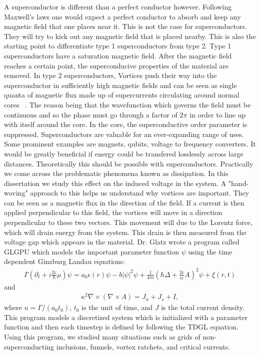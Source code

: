  A superconductor is different than a perfect conductor however. Following Maxwell's laws one would expect a perfect conductor to absorb and keep any magnetic field that one places near it. This is not the case for superconductors. They will try to kick out any magnetic field that is placed nearby. This is also the starting point to differentiate type 1 superconductors from type 2. Type 1 superconductors have a saturation magnetic field. After the magnetic field reaches a certain point, the superconducive properties of the material are removed. In type 2 superconductors, Vortices push their way into the superconductor in sufficiently high magnetic fields and can be seen as single quanta of magnetic flux made up of supercurrents circulating around normal cores ~\cite{Kwok16}. The reason being that the wavefunction which governs the field must be continuous and so the phase must go through a factor of $2\pi$ in order to line up with itself around the core. In the core, the superconductive order parameter is suppressed.  
Superconductors are valuable for an ever-expanding range of uses. Some prominent examples are magnets, qubits, voltage to frequency converters. It would be greatly beneficial if energy could be transfered losslessly across large distances. Theoretically this should be possible with superconductors. Practically we come across the problematic phenomena known as dissipation.  In this dissertation we study this effect on the induced voltage in the system. A "hand-waving" approach to this helps us understand why vortices are important. They can be seen as a magnetic flux in the direction of the field. If a current is then applied perpendicular to this field, the vortices will move in a direction perpendicular to these two vectors. This movement will due to the Lorentz force, which will drain energy from the system. This drain is then measured from the voltage gap which appears in the material. Dr. Glatz wrote a program called {\sc GLGPU} which models the important parameter function $\psi$ using the time dependent Ginzburg Landau equations:
\begin{eqnarray}
\Gamma (\partial_t +i \frac{2e}{\hbar}\mu)\psi = a_0 \epsilon (r) \psi - b |\psi|^2 \psi + \frac{1}{4m} (\hbar \Delta + \frac{2e}{ic} A)^2 \psi + \xi (r,t)
\label{TDGL1}
\end{eqnarray}
and
\begin{eqnarray}
\kappa^2 \nabla \times (\nabla \times A) = J_n + J_s + I,
\label{TDGL2}
\end{eqnarray}
where $u = \Gamma/(a_0 t_0)$, $t_0$ is the unit of time, and $J$ is the total current density. This program models a discretized system which is initialized with a parameter function and then each timestep is defined by following the TDGL equation. Using this program, we studied many situations such as grids of non-superconducting inclusions, funnels, vortex ratchets, and critical currents.


